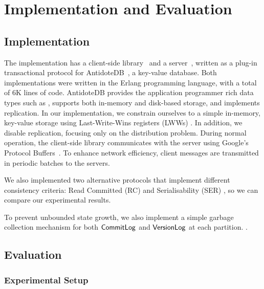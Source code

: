 \cleardoublepage
\chapter{Implementation and Evaluation}
\label{eval_chapter}

\section{Implementation}

The  implementation has a client-side library~\citep{pvc-client} and a server~\citep{pvc-server}, written as a plug-in transactional protocol for AntidoteDB~\citep{antidote-db}, a key-value database. Both implementations were written in the Erlang programming language, with a total of 6K lines of code. AntidoteDB provides the application programmer rich data types such as , supports both in-memory and disk-based storage, and implements  replication. In our implementation, we constrain ourselves to a simple in-memory, key-value storage using Last-Write-Wins registers (LWWs) . In addition, we disable replication, focusing only on the distribution problem. During normal operation, the client-side library communicates with the server using Google's Protocol Buffers~\citep{protobuf}. To enhance network efficiency, client messages are transmitted in periodic batches to the servers.

We also implemented two alternative protocols that implement different consistency criteria: Read Committed (RC) and Serialisability (SER) , so we can compare our experimental results.

To prevent unbounded state growth, we also implement a simple garbage collection mechanism for both $\mathsf{CommitLog}$ and $\mathsf{VersionLog}$ at each partition. .

\section{Evaluation}


\subsection{Experimental Setup}

